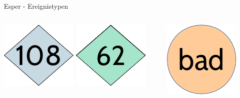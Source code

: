 \documentclass{beamer}
\begin{document}
\begin{frame}{Esper - Ereignistypen}
\begin{columns}   
    \begin{column}{0.5\textwidth}
        \begin{center}
            \hspace{1cm}\includegraphics[scale=0.3]{img/ereignis_aa1}
            \includegraphics[scale=0.3]{img/ereignis_a1}
        \end{center} 
    \end{column} 
    \begin{column}{0.5\textwidth}
        \begin{center}
            \includegraphics[scale=0.3]{img/ereignis_b1}
        \end{center}  
        
    \end{column}
\end{columns}
\end{frame}
\end{document}

